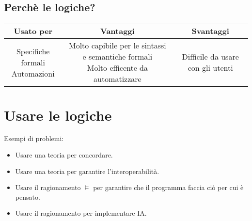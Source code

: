 \documentclass[../main.tex]{subfiles}
\begin{document}
    \subsection{Perchè le logiche?}
    \begin{center}
        \begin{tabular}{|c|c|c|}
            \hline
            Usato per & Vantaggi & Svantaggi\\
            \hline
            \makecell{Specifiche formali\\ Automazioni} & \makecell{Molto capibile per le sintassi e semantiche formali\\ Molto efficente da automatizzare} & Difficile da usare con gli utenti\\
            \hline
        \end{tabular}
    \end{center}

    \section{Usare le logiche}
    Esempi di problemi:
    \begin{itemize}
        \item Usare una teoria per concordare.
        \item Usare una teoria per garantire l'interoperabilità.
        \item Usare il ragionamento $\models$ per garantire che il programma faccia ciò per cui è pensato.
        \item Usare il ragionamento per implementare IA.
    \end{itemize}
\end{document}
